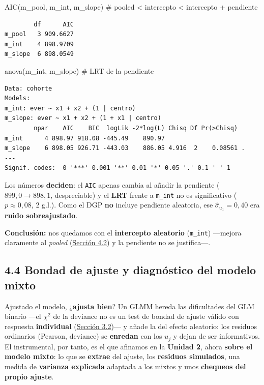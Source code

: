 \documentclass[
  letterpaper,
  DIV=11,
  numbers=noendperiod]{scrartcl}
\newenvironment{Shaded}{\begin{snugshade}}{\end{snugshade}}
\newcommand{\CommentTok}[1]{\textcolor[rgb]{0.37,0.37,0.37}{#1}}
\newcommand{\FunctionTok}[1]{\textcolor[rgb]{0.28,0.35,0.67}{#1}}
\newcommand{\NormalTok}[1]{\textcolor[rgb]{0.00,0.23,0.31}{#1}}
\begin{document}
\begin{Shaded}
\begin{Highlighting}[]
\FunctionTok{AIC}\NormalTok{(m\_pool, m\_int, m\_slope)   }\CommentTok{\# pooled  \textless{}  intercepto  \textless{}  intercepto + pendiente}
\end{Highlighting}
\end{Shaded}

\begin{verbatim}
        df      AIC
m_pool   3 909.6627
m_int    4 898.9709
m_slope  6 898.0549
\end{verbatim}

\begin{Shaded}
\begin{Highlighting}[]
\FunctionTok{anova}\NormalTok{(m\_int, m\_slope)          }\CommentTok{\# LRT de la pendiente}
\end{Highlighting}
\end{Shaded}

\begin{verbatim}
Data: cohorte
Models:
m_int: ever ~ x1 + x2 + (1 | centro)
m_slope: ever ~ x1 + x2 + (1 + x1 | centro)
        npar    AIC    BIC  logLik -2*log(L) Chisq Df Pr(>Chisq)  
m_int      4 898.97 918.08 -445.49    890.97                      
m_slope    6 898.05 926.71 -443.03    886.05 4.916  2    0.08561 .
---
Signif. codes:  0 '***' 0.001 '**' 0.01 '*' 0.05 '.' 0.1 ' ' 1
\end{verbatim}

Los números \textbf{deciden}: el \texttt{AIC} apenas cambia al añadir la
pendiente (\(899{,}0\to898{,}1\), despreciable) y el \textbf{LRT} frente
a \texttt{m\_int} no es significativo (\(p\approx0{,}08\), 2 g.l.). Como
el DGP \textbf{no} incluye pendiente aleatoria, ese
\(\hat\sigma_{u_1}=0{,}40\) era \textbf{ruido sobreajustado}.

\textbf{Conclusión:} nos quedamos con el \textbf{intercepto aleatorio}
(\texttt{m\_int}) ---mejora claramente al \emph{pooled}
(\protect\hyperlink{sec-u14-intercepto}{Sección 4.2}) y la pendiente no
se justifica---.

\hypertarget{sec-u14-diagnostico}{%
\subsection{4.4 Bondad de ajuste y diagnóstico del modelo
mixto}\label{sec-u14-diagnostico}}

Ajustado el modelo, ¿\textbf{ajusta bien}? Un GLMM hereda las
dificultades del GLM binario ---el \(\chi^2\) de la deviance no es un
test de bondad de ajuste válido con respuesta \textbf{individual}
(\protect\hyperlink{sec-u13-gof-binomial}{Sección 3.2})--- y añade la
del efecto aleatorio: los residuos ordinarios (Pearson, deviance) se
\textbf{enredan} con los \(u_j\) y dejan de ser informativos. El
instrumental, por tanto, es el que afinamos en la \textbf{Unidad 2},
ahora \textbf{sobre el modelo mixto}: lo que se \textbf{extrae} del
ajuste, los \textbf{residuos simulados}, una medida de \textbf{varianza
explicada} adaptada a los mixtos y unos \textbf{chequeos del propio
ajuste}.
\end{document}
